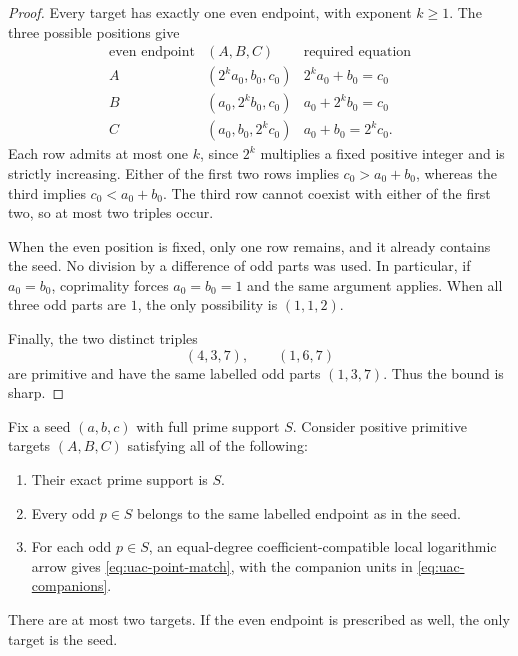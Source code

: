 \begin{proof}
Every target has exactly one even endpoint, with exponent $k\ge1$.
The three possible positions give
\begin{equation}\label{eq:uac-fibre-cases}
\begin{array}{c|c|c}
 \text{even endpoint}&(A,B,C)&\text{required equation}\\ \hline
 A&(2^ka_0,b_0,c_0)&2^ka_0+b_0=c_0\\
 B&(a_0,2^kb_0,c_0)&a_0+2^kb_0=c_0\\
 C&(a_0,b_0,2^kc_0)&a_0+b_0=2^kc_0 .
\end{array}
\end{equation}
Each row admits at most one $k$, since $2^k$ multiplies a fixed
positive integer and is strictly increasing. Either of the first
two rows implies $c_0>a_0+b_0$, whereas the third implies
$c_0<a_0+b_0$. The third row cannot coexist with either of the
first two, so at most two triples occur.

When the even position is fixed, only one row remains, and it
already contains the seed. No division by a difference of odd
parts was used. In particular, if $a_0=b_0$, coprimality forces
$a_0=b_0=1$ and the same argument applies. When all three odd
parts are $1$, the only possibility is $(1,1,2)$.

Finally, the two distinct triples
\begin{equation}\label{eq:uac-sharp-triples}
                          (4,3,7),\qquad(1,6,7)
\end{equation}
are primitive and have the same labelled odd parts $(1,3,7)$.
Thus the bound is sharp.
\end{proof}

\begin{corollary}
\label{cor:uac-rational-return-fibre}
Fix a seed $(a,b,c)$ with full prime support $S$. Consider positive
primitive targets $(A,B,C)$ satisfying all of the following:
\begin{enumerate}
\item Their exact prime support is $S$.
\item Every odd $p\in S$ belongs to the same labelled endpoint as
in the seed.
\item For each odd $p\in S$, an equal-degree coefficient-compatible
local logarithmic arrow gives \eqref{eq:uac-point-match}, with the
companion units in \eqref{eq:uac-companions}.
\end{enumerate}
There are at most two targets. If the even endpoint is prescribed
as well, the only target is the seed.
\end{corollary}

